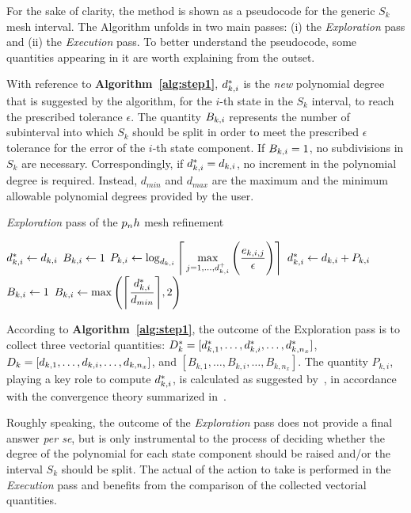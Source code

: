 For the sake of clarity, the method is shown as a pseudocode for the generic $S_k$ mesh interval. The Algorithm unfolds in two main passes: (i) the \emph{Exploration} pass and (ii) the \emph{Execution} pass.
To better understand the pseudocode, some quantities appearing in it are worth explaining from the outset.

With reference to {\bf Algorithm~\ref{alg:step1}}, $d_{k,i}^{*}$ is the \emph{new} polynomial degree that is suggested by the algorithm, for the $i$-th state in the $S_k$ interval, to reach the prescribed tolerance $\epsilon$. The quantity $B_{k,i}$ represents the number of subinterval into which $S_k$ should be split in order to meet the prescribed $\epsilon$ tolerance for the error of the $i$-th state component. If $B_{k,i} = 1$, no subdivisions in $S_k$ are necessary. Correspondingly, if $d_{k,i}^{*} = d_{k,i}$, no increment in the polynomial degree is required. Instead, $d_{min}$ and $d_{max}$ are the maximum and the minimum allowable polynomial degrees provided by the user.
\begin{algorithm}
\caption{\emph{Exploration} pass of the $p_{n}h$ mesh refinement}\label{alg:step1}
	\begin{algorithmic}[1]
				\State $d_{k,i}^{*} \gets d_{k,i}$ 
				\State $B_{k,i} \gets 1$     
			\Else
				\State $P_{k,i} \gets \log_{d_{k,i}} \Bigg\lceil \max\limits_{j= 1, \dots, d_{k,i}^{+}} \Bigg(\dfrac{e_{k,i,j}}{\epsilon}\Bigg) \Bigg\rceil$
				\State $d_{k,i}^{*} \gets d_{k,i} + P_{k,i}$ 
						\State $B_{k,i} \gets 1$		
					\Else
						\State $B_{k,i} \gets \max\Bigg(\Bigg\lceil \dfrac{d_{k,i}^{*}}{d_{min}}\Bigg\rceil, 2\Bigg)$ 
					\EndIf
			\EndIf
		\EndFor
	\end{algorithmic}
\end{algorithm}

According to {\bf Algorithm~\ref{alg:step1}}, the outcome of the Exploration pass is to collect three vectorial quantities: $D_{k}^{*} = [d_{k,1}^{*}, \dots, d_{k,i}^{*}, \dots, d_{k,n_x}^{*}]$, $D_{k} = [d_{k,1}, \dots, d_{k,i}, \dots, d_{k,n_x}]$, and $[B_{k,1}, \ldots, B_{k,i}, \ldots, B_{k,n_x}]$. The quantity $P_{k,i}$, playing a key role to compute $d_{k,i}^{*}$, is calculated as suggested by~\cite{Patterson:OCAM:2015}, in accordance with the convergence theory summarized in~\cite{Hou:GNC:2012,Hou:PHD:2013}.

Roughly speaking, the outcome of the \emph{Exploration} pass does not provide a final answer \emph{per se}, but is only instrumental to the process of deciding whether the degree of the polynomial for each state component should be raised and/or the interval $S_k$ should be split. The actual of the action to take is performed in the \emph{Execution} pass and benefits from the comparison of the collected vectorial quantities.

